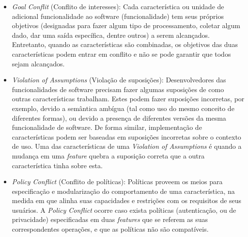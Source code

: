 \begin{itemize}
\item \textit{Goal Conflit} (Conflito de interesses): Cada característica ou unidade de adicional funcionalidade ao software (funcionalidade) tem seus próprios objetivos (designadas para fazer algum tipo de processamento, coletar algum dado, dar uma saída específica, dentre outros) a serem alcançados. Entretanto, quando as características são combinadas, os objetivos das duas características podem entrar em conflito e não se pode garantir que todos sejam alcançados. 
\item \textit{Violation of Assumptions} (Violação de suposições): Desenvolvedores das funcionalidades de software precisam fazer algumas suposições de como outras características trabalham. Estes podem fazer suposições incorretas, por exemplo, devido a semântica ambígua (tal como uso do mesmo conceito de diferentes formas), ou devido a presença de diferentes versões da mesma funcionalidade de software. De forma similar, implementação de características podem ser baseadas em suposições incorretas sobre o contexto de uso. Uma das características de uma \textit{Violation of Assumptions} é quando a mudança em uma \textit{feature} quebra a suposição correta que a outra característica tinha sobre esta.
\item \textit{Policy Conflict} (Conflito de políticas): Políticas proveem os meios para especificação e modularização do comportamento de uma característica, na medida em que alinha suas capacidades e restrições com os requisitos de seus usuários. A \textit{Policy Conflict} ocorre caso exista políticas (autenticação, ou de privacidade) especificadas em duas \textit{features} que se referem as suas correspondentes operações, e que as políticas não são compatíveis.
\end{itemize}

